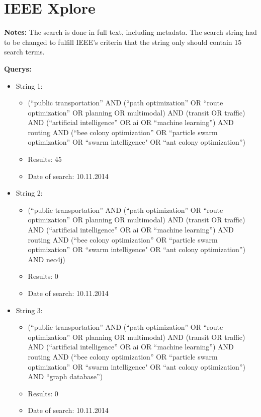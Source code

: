 \section{IEEE Xplore}
\par \textbf{Notes:} The search is done in full text, including metadata. The search string had to be changed to fulfill IEEE's criteria that the string only should contain 15 search terms.  
\par \textbf{Querys:}
\begin{itemize}
	\item String 1: 
	\begin{itemize}
		\item(``public transportation'' AND (``path optimization'' OR ``route optimization'' OR planning OR multimodal) AND (transit OR traffic) AND (``artificial intelligence'' OR ai OR ``machine learning'') AND routing AND (``bee colony optimization'' OR ``particle swarm optimization'' OR ``swarm intelligence" OR ``ant colony optimization'')
		\item Results: 45
		\item Date of search: 10.11.2014
	\end{itemize}
	\item String 2:
	\begin{itemize}
		\item(``public transportation'' AND (``path optimization'' OR ``route optimization'' OR planning OR multimodal) AND (transit OR traffic) AND (``artificial intelligence'' OR ai OR ``machine learning'') AND routing AND (``bee colony optimization'' OR ``particle swarm optimization'' OR ``swarm intelligence" OR ``ant colony optimization'') AND neo4j)
		\item Results: 0
		\item Date of search: 10.11.2014
	\end{itemize}
	\item String 3:
	\begin{itemize}
		\item(``public transportation'' AND (``path optimization'' OR ``route optimization'' OR planning OR multimodal) AND (transit OR traffic) AND (``artificial intelligence'' OR ai OR ``machine learning'') AND routing AND (``bee colony optimization'' OR ``particle swarm optimization'' OR ``swarm intelligence" OR ``ant colony optimization'') AND ``graph database'')
		\item Results: 0
		\item Date of search: 10.11.2014
	\end{itemize}
\end{itemize}

